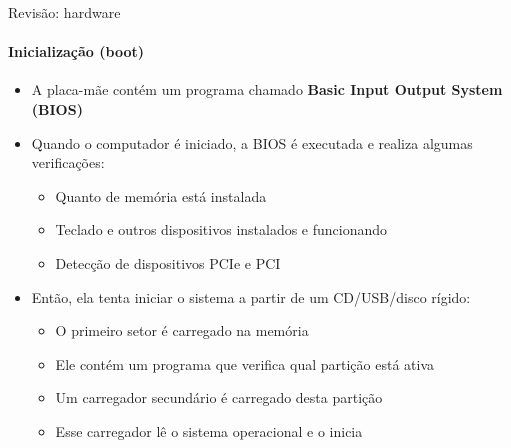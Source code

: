 \documentclass{beamer}
\begin{document}
\begin{frame}{Revisão: hardware}
	\framesubtitle{Inicialização (boot)}
	\begin{itemize}
		\item A placa-mãe contém um programa chamado \textbf{Basic Input Output System (BIOS)}
		\item Quando o computador é iniciado, a BIOS é executada e realiza algumas verificações:
		\begin{itemize}
			\item Quanto de memória está instalada
			\item Teclado e outros dispositivos instalados e funcionando
			\item Detecção de dispositivos PCIe e PCI
		\end{itemize}
		\item Então, ela tenta iniciar o sistema a partir de um CD/USB/disco rígido:
		\begin{itemize}
			\item O primeiro setor é carregado na memória
			\item Ele contém um programa que verifica qual partição está ativa
			\item Um carregador secundário é carregado desta partição
			\item Esse carregador lê o sistema operacional e o inicia
		\end{itemize}
	\end{itemize}
\end{frame}
\end{document}
